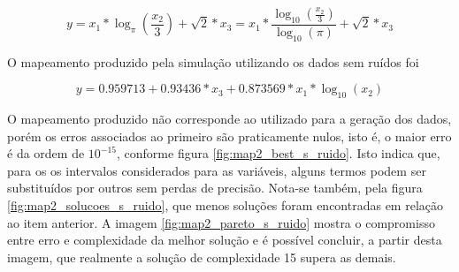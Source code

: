 \begin{equation}
y = x_1*\log_{\pi}\left( \frac{x_2}{3}  \right) + \sqrt{2}*x_3 = 
x_1*\frac{\log_{10}\left( \frac{x_2}{3}  \right)}{\log_{10}(\pi)} + \sqrt{2}*x_3
\label{eq:map2}
\end{equation}

O mapeamento produzido pela simulação utilizando os dados sem ruídos
foi 

\begin{equation}
y =  0.959713 + 0.93436*x_3 + 0.873569*x_1*\log_{10}(x_2)
\label{eq:map2_s}
\end{equation}

O mapeamento produzido não corresponde ao utilizado para a geração dos dados,
porém os erros associados ao primeiro são praticamente nulos, isto é, o maior
erro é da ordem de \(10^{-15}\), conforme figura \ref{fig:map2_best_s_ruido}.
Isto indica que, para os os intervalos considerados para as variáveis, alguns
termos podem ser substituídos por outros sem perdas de precisão. Nota-se também,
pela figura \ref{fig:map2_solucoes_s_ruido}, que menos soluções foram encontradas em relação ao
item anterior. A imagem \ref{fig:map2_pareto_s_ruido} mostra o compromisso entre
erro e complexidade da melhor solução e é possível concluir, a partir desta
imagem, que realmente a solução de complexidade 15 supera as demais.

\FloatBarrier
			    
